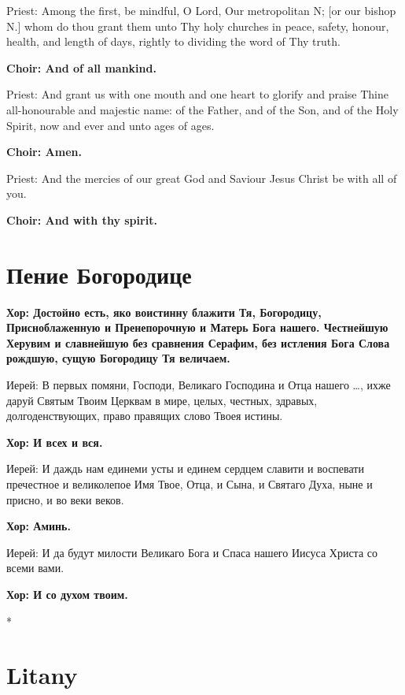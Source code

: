 \documentclass[12pt,a4paper,titlepage]{report}
\begin{document}
\begin{paracol}[1]{2}
	Priest: Among the first, be mindful, O Lord, Our metropolitan N; [or our bishop N.] whom do thou grant them unto Thy holy churches in peace, safety, honour, health, and length of days, rightly to dividing the word of Thy truth.
	
	\textbf{Choir: And of all mankind.}
	
	Priest: And grant us with one mouth and one heart to glorify and praise Thine all-honourable and majestic name: of the Father, and of the Son, and of the Holy Spirit, now and ever and unto ages of ages.
	
	\textbf{Choir: Amen.}
	
	Priest: And the mercies of our great God and Saviour Jesus Christ be with all of you.
	
	\textbf{Choir: And with thy spirit.}
	
	\switchcolumn[1]
	
	\section*{Пение Богородице}
	
	\textbf{Хор: Достойно есть, яко воистинну блажити Тя, Богородицу, Присноблаженную и Пренепорочную и Матерь Бога нашего. Честнейшую Херувим и славнейшую без сравнения Серафим, без истления Бога Слова рождшую, сущую Богородицу Тя величаем.}
	
	Иерей: В первых помяни, Господи, Великаго Господина и Отца нашего \ldots, ихже даруй Святым Твоим Церквам в мире, целых, честных, здравых, долгоденствующих, право правящих слово Твоея истины.
	
	\textbf{Хор: И всех и вся.}
	
	Иерей: И даждь нам единеми усты и единем сердцем славити и воспевати пречестное и великолепое Имя Твое, Отца, и Сына, и Святаго Духа, ныне и присно, и во веки веков.
	
	\textbf{Хор: Аминь.}
	
	Иерей: И да будут милости Великаго Бога и Спаса нашего Иисуса Христа со всеми вами.
	
	\textbf{Хор: И со духом твоим.}
	
	\switchcolumn[0]*
	
	\section*{Litany}
	

\end{paracol}
\end{document}
